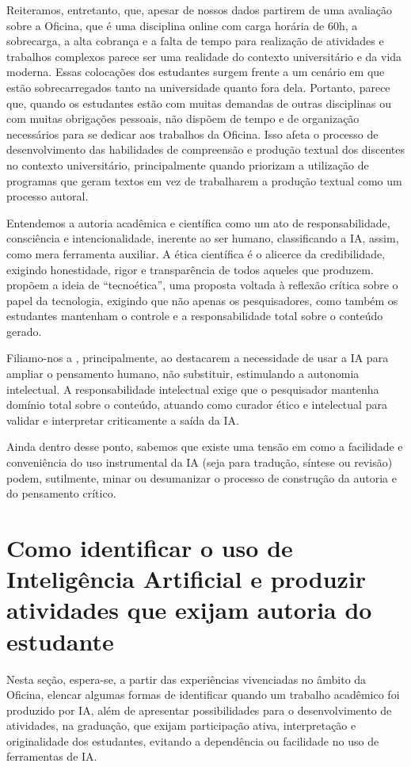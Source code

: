 \documentclass[portuguese]{textolivre}
\begin{document}
Reiteramos, entretanto, que, apesar de nossos dados partirem de uma avaliação sobre a Oficina, que é uma disciplina online com carga horária de 60h, a sobrecarga, a alta cobrança e a falta de tempo para realização de atividades e trabalhos complexos parece ser uma realidade do contexto universitário e da vida moderna. Essas colocações dos estudantes surgem frente a um cenário em que estão sobrecarregados tanto na universidade quanto fora dela. Portanto, parece que, quando os estudantes estão com muitas demandas de outras disciplinas ou com muitas obrigações pessoais, não dispõem de tempo e de organização necessários para se dedicar aos trabalhos da Oficina. Isso afeta o processo de desenvolvimento das habilidades de compreensão e produção textual dos discentes no contexto universitário, principalmente quando priorizam a utilização de programas que geram textos em vez de trabalharem a produção textual como um processo autoral.

Entendemos a autoria acadêmica e científica como um ato de responsabilidade, consciência e intencionalidade, inerente ao ser humano, classificando a IA, assim, como mera ferramenta auxiliar. A ética científica é o alicerce da credibilidade, exigindo honestidade, rigor e transparência de todos aqueles que produzem. \textcite{souza2025} propõem a ideia de ``tecnoética'', uma proposta voltada à reflexão crítica sobre o papel da tecnologia, exigindo que não apenas os pesquisadores, como também os estudantes mantenham o controle e a responsabilidade total sobre o conteúdo gerado.

Filiamo-nos a \textcite{souza2025}, principalmente, ao destacarem a necessidade de usar a IA para ampliar o pensamento humano, não substituir, estimulando a autonomia intelectual. A responsabilidade intelectual exige que o pesquisador mantenha domínio total sobre o conteúdo, atuando como curador ético e intelectual para validar e interpretar criticamente a saída da IA.

Ainda dentro desse ponto, sabemos que existe uma tensão em como a facilidade e conveniência do uso instrumental da IA (seja para tradução, síntese ou revisão) podem, sutilmente, minar ou desumanizar o processo de construção da autoria e do pensamento crítico.

\section{Como identificar o uso de Inteligência Artificial e produzir atividades que exijam autoria do estudante}\label{sec-4}
Nesta seção, espera-se, a partir das experiências vivenciadas no âmbito da Oficina, elencar algumas formas de identificar quando um trabalho acadêmico foi produzido por IA, além de apresentar possibilidades para o desenvolvimento de atividades, na graduação, que exijam participação ativa, interpretação e originalidade dos estudantes, evitando a dependência ou facilidade no uso de ferramentas de IA.
\end{document}
